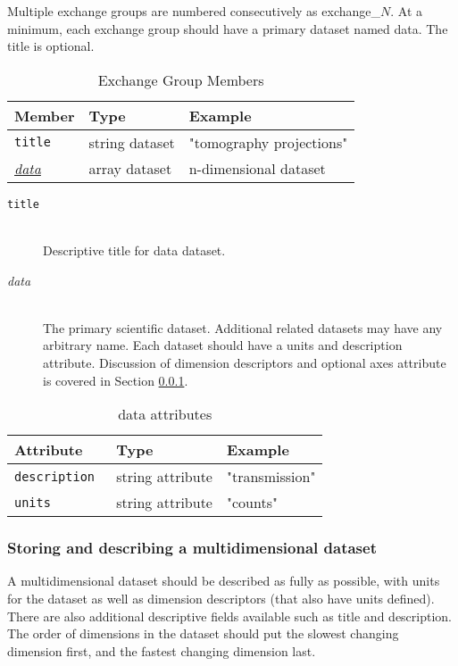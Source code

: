 Multiple exchange groups are numbered consecutively as exchange\_$N$. At a 
minimum, each exchange group should have a primary dataset named
data. The title is optional.

\begin{table}[h!]\sffamily \footnotesize
\centering
\caption{Exchange Group Members}
\begin{tabular}{l l l}
\toprule
\bfseries Member     & \bfseries Type & \bfseries Example \\
\midrule
\tt{title}  & string dataset & "tomography projections" \\
\hyperref[data:attr]{\emph{data}}  &  array dataset & {n-dimensional dataset} \\
\bottomrule
\end{tabular}
\end{table}

\begin{description}
\item[\tt{title}] \hfill \\
{Descriptive title for data dataset.}

\item[\emph{data}] \hfill \\
{The primary scientific dataset. Additional related datasets may have any
arbitrary name. Each dataset should have a units and description attribute.
Discussion of dimension descriptors and optional axes attribute is covered
in Section \ref{sec:multidims}.}
\end{description}

\begin{table}[h!]\sffamily \footnotesize
\centering
\caption{data attributes}
\label{data:attr}
\begin{tabular}{l l l}
\toprule
\bfseries Attribute     & \bfseries Type & \bfseries Example \\
\midrule
\tt{description}  & string attribute & "transmission"  \\
\tt{units}  & string attribute & "counts"  \\
\bottomrule
\end{tabular}
\end{table}

\subsubsection{Storing and describing a multidimensional dataset}
\label{sec:multidims}
A multidimensional dataset should be described as fully as possible, with units for the dataset as well as 
dimension descriptors (that also have units defined). There are also additional descriptive fields available 
such as title and description. The order of dimensions in the dataset should put the slowest changing 
dimension first, and the fastest changing dimension last. 

